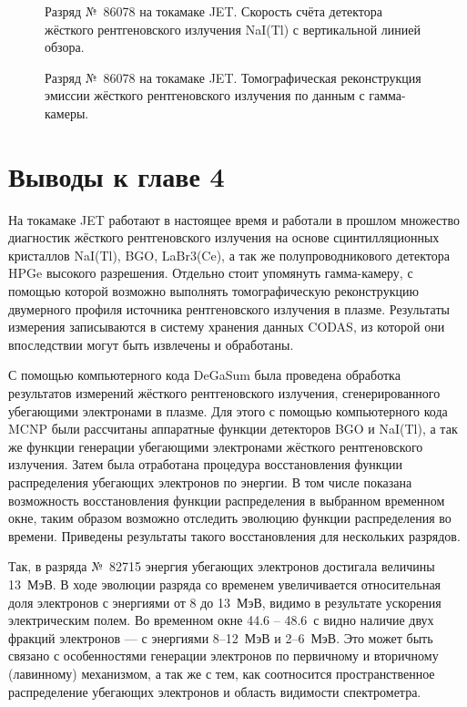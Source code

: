 \begin{figure}[ht!]
  \caption{ Разряд №~86078 на токамаке JET. Скорость счёта детектора жёсткого рентгеновского излучения NaI(Tl) с вертикальной линией обзора.~\cite{Plyusnin2015} }
  \label{fig:jetPulseHxrNaI86078}
\end{figure}

\begin{figure}[ht!]
  \caption{ Разряд №~86078 на токамаке JET. Томографическая реконструкция эмиссии жёсткого рентгеновского излучения по данным с гамма-камеры.~\cite{Plyusnin2015} }
  \label{fig:jetPulseHxrTomography86078}
\end{figure}



\FloatBarrier
\section{Выводы к главе 4}

На токамаке JET работают в настоящее время и работали в прошлом множество диагностик жёсткого рентгеновского излучения на основе сцинтилляционных кристаллов NaI(Tl), BGO, LaBr3(Ce), а так же полупроводникового детектора HPGe высокого разрешения. Отдельно стоит упомянуть гамма-камеру, с помощью которой возможно выполнять томографическую реконструкцию двумерного профиля источника рентгеновского излучения в плазме. Результаты измерения записываются в систему хранения данных CODAS, из которой они впоследствии могут быть извлечены и обработаны. 

С помощью компьютерного кода DeGaSum была проведена обработка результатов измерений жёсткого рентгеновского излучения, сгенерированного убегающими электронами в плазме. Для этого с помощью компьютерного кода MCNP были рассчитаны аппаратные функции детекторов BGO и NaI(Tl), а так же функции генерации убегающими электронами жёсткого рентгеновского излучения. Затем была отработана процедура восстановления функции распределения убегающих электронов по энергии. В том числе показана возможность восстановления функции распределения в выбранном временном окне, таким образом возможно отследить эволюцию функции распределения во времени. Приведены результаты такого восстановления для нескольких разрядов. 

Так, в разряда №~82715 энергия убегающих электронов достигала величины 13~МэВ. В ходе эволюции разряда со временем увеличивается относительная доля электронов с энергиями от 8 до 13~МэВ, видимо в результате ускорения электрическим полем. Во временном окне 44.6 -- 48.6~с видно наличие двух фракций электронов --- с энергиями 8--12~МэВ и 2--6~МэВ. Это может быть связано с особенностями генерации электронов по первичному и вторичному (лавинному) механизмом, а так же с тем, как соотносится пространственное распределение убегающих электронов и область видимости спектрометра.  

